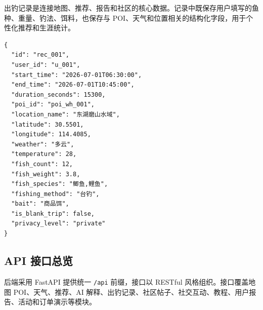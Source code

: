 出钓记录是连接地图、推荐、报告和社区的核心数据。记录中既保存用户填写的鱼种、重量、钓法、饵料，也保存与 POI、天气和位置相关的结构化字段，用于个性化推荐和生涯统计。

\begin{lstlisting}[caption={出钓记录数据模型示例},label={lst:record-schema}]
{
  "id": "rec_001",
  "user_id": "u_001",
  "start_time": "2026-07-01T06:30:00",
  "end_time": "2026-07-01T10:45:00",
  "duration_seconds": 15300,
  "poi_id": "poi_wh_001",
  "location_name": "东湖磨山水域",
  "latitude": 30.5501,
  "longitude": 114.4085,
  "weather": "多云",
  "temperature": 28,
  "fish_count": 12,
  "fish_weight": 3.8,
  "fish_species": "鲫鱼,鲤鱼",
  "fishing_method": "台钓",
  "bait": "商品饵",
  "is_blank_trip": false,
  "privacy_level": "private"
}
\end{lstlisting}

\subsection{API 接口总览}

后端采用 FastAPI 提供统一 \texttt{/api} 前缀，接口以 RESTful 风格组织。接口覆盖地图 POI、天气、推荐、AI 解释、出钓记录、社区帖子、社交互动、教程、用户报告、活动和订单演示等模块。

